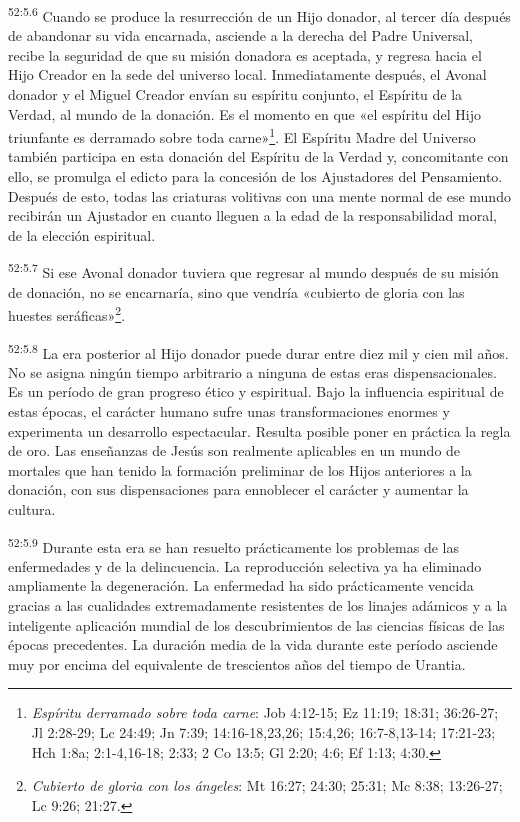 \par
\textsuperscript{52:5.6} Cuando se produce la resurrección de un Hijo donador, al tercer día después de abandonar su vida encarnada, asciende a la derecha del Padre Universal, recibe la seguridad de que su misión donadora es aceptada, y regresa hacia el Hijo Creador en la sede del universo local. Inmediatamente después, el Avonal donador y el Miguel Creador envían su espíritu conjunto, el Espíritu de la Verdad, al mundo de la donación. Es el momento en que «el espíritu del Hijo triunfante es derramado sobre toda carne»\footnote{\textit{Espíritu derramado sobre toda carne}: Job 4:12-15; Ez 11:19; 18:31; 36:26-27; Jl 2:28-29; Lc 24:49; Jn 7:39; 14:16-18,23,26; 15:4,26; 16:7-8,13-14; 17:21-23; Hch 1:8a; 2:1-4,16-18; 2:33; 2 Co 13:5; Gl 2:20; 4:6; Ef 1:13; 4:30.}. El Espíritu Madre del Universo también participa en esta donación del Espíritu de la Verdad y, concomitante con ello, se promulga el edicto para la concesión de los Ajustadores del Pensamiento. Después de esto, todas las criaturas volitivas con una mente normal de ese mundo recibirán un Ajustador en cuanto lleguen a la edad de la responsabilidad moral, de la elección espiritual.

\par
\textsuperscript{52:5.7} Si ese Avonal donador tuviera que regresar al mundo después de su misión de donación, no se encarnaría, sino que vendría «cubierto de gloria con las huestes seráficas»\footnote{\textit{Cubierto de gloria con los ángeles}: Mt 16:27; 24:30; 25:31; Mc 8:38; 13:26-27; Lc 9:26; 21:27.}.

\par
\textsuperscript{52:5.8} La era posterior al Hijo donador puede durar entre diez mil y cien mil años. No se asigna ningún tiempo arbitrario a ninguna de estas eras dispensacionales. Es un período de gran progreso ético y espiritual. Bajo la influencia espiritual de estas épocas, el carácter humano sufre unas transformaciones enormes y experimenta un desarrollo espectacular. Resulta posible poner en práctica la regla de oro. Las enseñanzas de Jesús son realmente aplicables en un mundo de mortales que han tenido la formación preliminar de los Hijos anteriores a la donación, con sus dispensaciones para ennoblecer el carácter y aumentar la cultura.

\par
\textsuperscript{52:5.9} Durante esta era se han resuelto prácticamente los problemas de las enfermedades y de la delincuencia. La reproducción selectiva ya ha eliminado ampliamente la degeneración. La enfermedad ha sido prácticamente vencida gracias a las cualidades extremadamente resistentes de los linajes adámicos y a la inteligente aplicación mundial de los descubrimientos de las ciencias físicas de las épocas precedentes. La duración media de la vida durante este período asciende muy por encima del equivalente de trescientos años del tiempo de Urantia.

